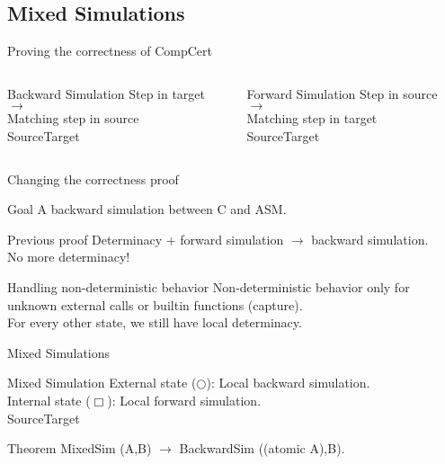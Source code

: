 \subsection{Mixed Simulations}
\begin{frame}{Proving the correctness of CompCert}
  \begin{columns}[T] %
    \begin{column}{.48\textwidth}
      \begin{block}{Backward Simulation}
        Step in target $\rightarrow$\\ Matching step in source\\
        {\color{blue}Source\hfill\color{red}Target}
        \backward
      \end{block}
    \end{column}%
    \hfill
    \begin{column}{.48\textwidth}
      \begin{block}{Forward Simulation}
        Step in source $\rightarrow$\\ Matching step in target\\
        {\color{blue}Source\hfill\color{red}Target}
        \forward
      \end{block}
    \end{column}%
  \end{columns}
\end{frame}

\begin{frame}{Changing the correctness proof}
  \begin{exampleblock}{Goal}
    A backward simulation between C and ASM.
  \end{exampleblock}
  \vfill
  \begin{alertblock}{Previous proof}
    Determinacy + forward simulation $\rightarrow$ backward simulation.\\
    No more determinacy!
  \end{alertblock}
  \vfill
  \begin{exampleblock}{Handling non-deterministic behavior}
    Non-deterministic behavior only for unknown external calls or builtin functions (capture).\\
    For every other state, we still have local determinacy.
  \end{exampleblock}
\end{frame}

\begin{frame}{Mixed Simulations}
  \begin{block}{Mixed Simulation}
    External state ($\bigcirc$): Local backward simulation.\\
    Internal state ($\Box$): Local forward simulation.\\
    {\color{blue}Source\hfill\color{red}Target}
    \vspace{-0.8cm}
    \mixed
  \end{block}
  \vfill
  \begin{block}{Theorem}
    MixedSim (A,B) $\rightarrow$ BackwardSim ((atomic A),B).
  \end{block}
\end{frame}

